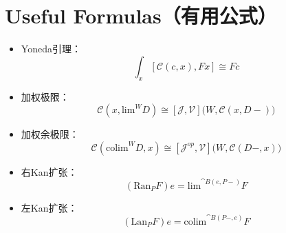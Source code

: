 \documentclass[DaoFP]{subfiles}
\begin{document}
 \section{Useful Formulas（有用公式）}
 \begin{itemize}
  \item Yoneda引理：
  \[ \int_x [\mathcal C( c, x), F x] \cong F c \]
  \item 加权极限：
  \[  \mathcal C(x, \text{lim}^W D) \cong [\mathcal J, \mathcal V] \big(W, \mathcal C(x, D-)\big) \]
  \item 加权余极限：
  \[  \mathcal C(\text{colim}^W D, x) \cong [\mathcal J^{op}, \mathcal V] \big(W, \mathcal C(D-, x)\big) \]
  \item 右Kan扩张：
  \[ (\text{Ran}_P F) e = \text{lim}^{\cat B(e, P-)} F  \]
  \item 左Kan扩张：
  \[ (\text{Lan}_P F) e = \text{colim}^{\cat B(P-, e)} F \]
 \end{itemize}
\end{document}
